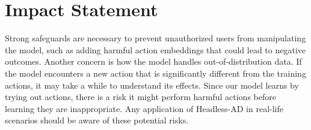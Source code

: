 \documentclass{article}
\theoremstyle{plain}
\theoremstyle{definition}
\theoremstyle{remark}
\begin{document}
\section*{Impact Statement}
Strong safeguards are necessary to prevent unauthorized users from manipulating the model, such as adding harmful action embeddings that could lead to negative outcomes.
Another concern is how the model handles out-of-distribution data. If the model encounters a new action that is significantly different from the training actions, it may take a while to understand its effects. Since our model learns by trying out actions, there is a risk it might perform harmful actions before learning they are inappropriate.
Any application of Headless-AD in real-life scenarios should be aware of these potential risks.


\newpage
\appendix
\onecolumn
\end{document}
